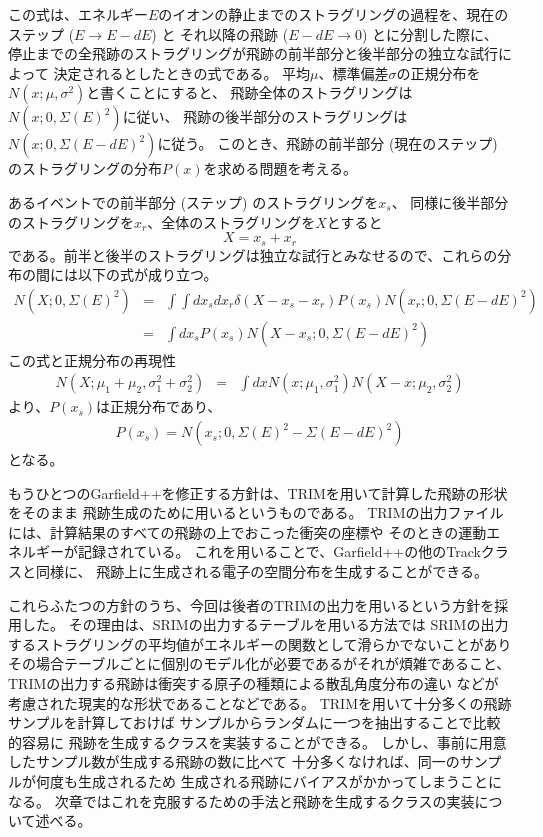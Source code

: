 \documentclass [11pt,a4paper,dvipdfmx] {jarticle}
\begin{document}
この式は、エネルギー$E$のイオンの静止までのストラグリングの過程を、現在のステップ ($E \rightarrow E-dE$) と
それ以降の飛跡 ($E -dE \rightarrow 0 $) とに分割した際に、
停止までの全飛跡のストラグリングが飛跡の前半部分と後半部分の独立な試行によって
決定されるとしたときの式である。
平均$\mu$、標準偏差$\sigma$の正規分布を$N(x;\mu,\sigma^2)$と書くことにすると、
飛跡全体のストラグリングは$N(x;0,\Sigma(E)^2)$に従い、
飛跡の後半部分のストラグリングは$N(x;0,\Sigma(E-dE)^2)$に従う。
このとき、飛跡の前半部分 (現在のステップ) のストラグリングの分布$P(x)$を求める問題を考える。

あるイベントでの前半部分 (ステップ) のストラグリングを$x_s$、
同様に後半部分のストラグリングを$x_r$、全体のストラグリングを$X$とすると
\begin{equation}
X = x_s + x_r
\end{equation}
である。前半と後半のストラグリングは独立な試行とみなせるので、これらの分布の間には以下の式が成り立つ。
\begin{eqnarray}
    N(X;0,\Sigma(E)^2)&=& \int\int dx_s dx_r \delta(X - x_s - x_r) P(x_s) N(x_r; 0, \Sigma(E-dE)^2) \nonumber \\
                &=&  \int dx_s P(x_s) N(X-x_s; 0, \Sigma(E-dE)^2)
\end{eqnarray}
この式と正規分布の再現性
\begin{eqnarray}
    N(X;\mu_1 + \mu_2,\sigma_1^2 + \sigma_2^2)&=& \int dx N(x; \mu_1, \sigma_1^2) N(X-x; \mu_2, \sigma_2^2)
\end{eqnarray}
より、$P(x_s)$は正規分布であり、
\begin{eqnarray}
    P(x_s) = N(x_s; 0, \Sigma(E)^2 - \Sigma(E-dE)^2) 
\end{eqnarray}
となる。

もうひとつのGarfield++を修正する方針は、TRIMを用いて計算した飛跡の形状をそのまま
飛跡生成のために用いるというものである。
TRIMの出力ファイルには、計算結果のすべての飛跡の上でおこった衝突の座標や
そのときの運動エネルギーが記録されている。
これを用いることで、Garfield++の他のTrackクラスと同様に、
飛跡上に生成される電子の空間分布を生成することができる。

これらふたつの方針のうち、今回は後者のTRIMの出力を用いるという方針を採用した。
その理由は、SRIMの出力するテーブルを用いる方法では
SRIMの出力するストラグリングの平均値がエネルギーの関数として滑らかでないことがあり
その場合テーブルごとに個別のモデル化が必要であるがそれが煩雑であること、
TRIMの出力する飛跡は衝突する原子の種類による散乱角度分布の違い
などが考慮された現実的な形状であることなどである。
TRIMを用いて十分多くの飛跡サンプルを計算しておけば
サンプルからランダムに一つを抽出することで比較的容易に
飛跡を生成するクラスを実装することができる。
しかし、事前に用意したサンプル数が生成する飛跡の数に比べて
十分多くなければ、同一のサンプルが何度も生成されるため
生成される飛跡にバイアスがかかってしまうことになる。
次章ではこれを克服するための手法と飛跡を生成するクラスの実装について述べる。
\end{document}
